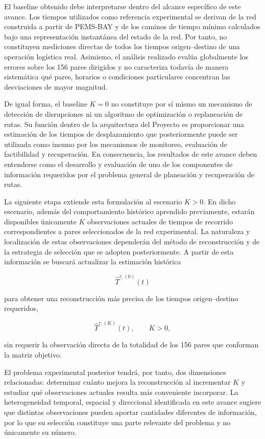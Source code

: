 \documentclass[11pt]{article}
\begin{document}
El baseline obtenido debe interpretarse dentro del alcance específico de este avance. Los tiempos utilizados como referencia experimental se derivan de la red construida a partir de PEMS-BAY y de los caminos de tiempo mínimo calculados bajo una representación instantánea del estado de la red. Por tanto, no constituyen mediciones directas de todos los tiempos origen--destino de una operación logística real. Asimismo, el análisis realizado evalúa globalmente los errores sobre los 156 pares dirigidos y no caracteriza todavía de manera sistemática qué pares, horarios o condiciones particulares concentran las desviaciones de mayor magnitud.

De igual forma, el baseline $K=0$ no constituye por sí mismo un mecanismo de detección de disrupciones ni un algoritmo de optimización o replaneación de rutas. Su función dentro de la arquitectura del Proyecto es proporcionar una estimación de los tiempos de desplazamiento que posteriormente puede ser utilizada como insumo por los mecanismos de monitoreo, evaluación de factibilidad y recuperación. En consecuencia, los resultados de este avance deben entenderse como el desarrollo y evaluación de uno de los componentes de información requeridos por el problema general de planeación y recuperación de rutas.

La siguiente etapa extiende esta formulación al escenario $K>0$. En dicho escenario, además del comportamiento histórico aprendido previamente, estarán disponibles únicamente $K$ observaciones actuales de tiempos de recorrido correspondientes a pares seleccionados de la red experimental. La naturaleza y localización de estas observaciones dependerán del método de reconstrucción y de la estrategia de selección que se adopten posteriormente. A partir de esta información se buscará actualizar la estimación histórica

\[
\widehat{T}^{\tau,(0)}(t)
\]

para obtener una reconstrucción más precisa de los tiempos origen--destino requeridos,

\[
\widehat{T}^{\tau,(K)}(t), \qquad K>0,
\]

sin requerir la observación directa de la totalidad de los 156 pares que conforman la matriz objetivo.

El problema experimental posterior tendrá, por tanto, dos dimensiones relacionadas: determinar cuánto mejora la reconstrucción al incrementar $K$ y estudiar qué observaciones actuales resulta más conveniente incorporar. La heterogeneidad temporal, espacial y direccional identificada en este avance sugiere que distintas observaciones pueden aportar cantidades diferentes de información, por lo que su selección constituye una parte relevante del problema y no únicamente su número.
\end{document}
